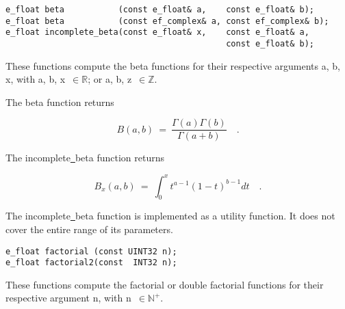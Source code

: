 \begin{lstlisting}
e_float beta           (const e_float& a,    const e_float& b);
e_float beta           (const ef_complex& a, const ef_complex& b);
e_float incomplete_beta(const e_float& x,    const e_float& a,
                                             const e_float& b);
\end{lstlisting}

\vspace{6.0pt}

 These functions compute the beta functions
for their respective arguments {\courier a}, {\courier b}, {\courier x},
with {\courier a}, {\courier b}, {\courier x}~$\in\mathbb{R}$; or
{\courier a}, {\courier b}, {\courier z}~$\in\mathbb{Z}$.

\vspace{6.0pt}

 The {\courier beta} function
returns~\cite{wolframfunctions:website}

\begin{equation}
B(a,b) \ = \ \frac{\Gamma(a) \Gamma(b)}{\Gamma(a+b)}\quad.
\end{equation}

\vspace{6.0pt}

 The {\courier incomplete\underline\ beta} function
returns~\cite{wolframfunctions:website}

\begin{equation}
B_{x}(a,b) \ = \ \int_{0}^{x} t^{a-1} (1-t)^{b-1} dt\quad.
\end{equation}

 The {\courier incomplete\underline\ beta} function
is implemented as a utility function. It does not cover the entire range of
its parameters.

\vspace{6.0pt}

\begin{lstlisting}
e_float factorial (const UINT32 n);
e_float factorial2(const  INT32 n);
\end{lstlisting}

\vspace{6.0pt}

 These functions compute the factorial or double factorial
functions for their respective argument {\courier n},
with {\courier n}~$\in\mathbb{N}^{+}$.


